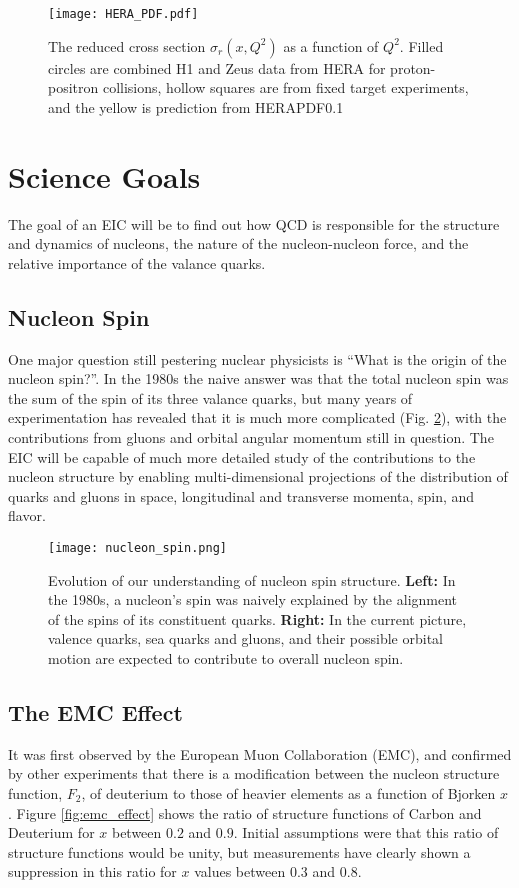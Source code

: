 \begin{figure}[ht]
	\centering
	\texttt{[image: HERA\_PDF.pdf]}
	\caption{The reduced cross section $\sigma_{r}(x,Q^2)$ as a function of $Q^2$. Filled circles are combined H1 and Zeus data from HERA for proton-positron collisions, hollow squares are from fixed target experiments, and the yellow is prediction from HERAPDF0.1}
	\label{fig:HERA_pdf2}
\end{figure}

\section{Science Goals}
The goal of an EIC will be to find out how QCD is responsible for the structure and dynamics of nucleons, the nature of the nucleon-nucleon force, and the relative importance of the valance quarks.

\subsection{Nucleon Spin}
One major question still pestering nuclear physicists is ``What is the origin of the nucleon spin?''. In the 1980s the naive answer was that the total nucleon spin was the sum of the spin of its three valance quarks, but many years of experimentation has revealed that it is much more complicated (Fig. \ref{fig:nucleon_spin}), with the contributions from gluons and orbital angular momentum still in question. The EIC will be capable of much more detailed study of the contributions to the nucleon structure by enabling multi-dimensional projections of the distribution of quarks and gluons in space, longitudinal and transverse momenta, spin, and flavor.

\begin{figure}[ht]
	\centering
	\texttt{[image: nucleon\_spin.png]}
	\caption{Evolution of our understanding of nucleon spin structure. \textbf{Left:} In the 1980s, a nucleon’s spin was naively explained by the alignment of the spins of its constituent quarks. \textbf{Right:} In the current picture, valence quarks, sea quarks and gluons, and their possible orbital motion are expected to contribute to overall nucleon spin.}
	\label{fig:nucleon_spin}
\end{figure}

\subsection{The EMC Effect}
It was first observed by the European Muon Collaboration (EMC), and confirmed by other experiments that there is a modification between the nucleon structure function, $F_2$, of deuterium to those of heavier elements as a function of Bjorken $x$ \cite{SRC_EMC_effect}. Figure \ref{fig:emc_effect} shows the ratio of structure functions of Carbon and Deuterium for $x$ between $0.2$ and $0.9$. Initial assumptions were that this ratio of structure functions would be unity, but measurements have clearly shown a suppression in this ratio for $x$ values between $0.3$ and $0.8$.

